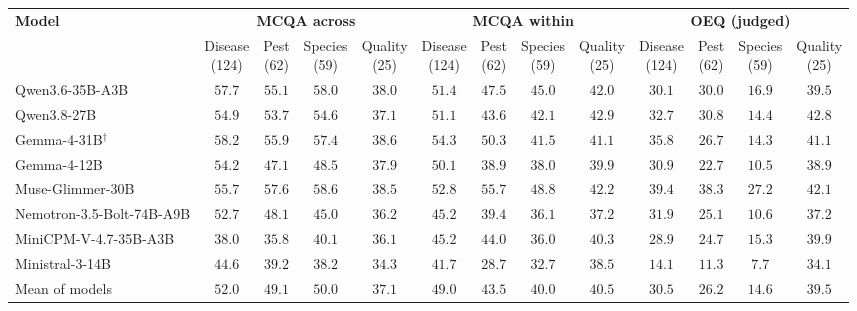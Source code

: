 \setlength{\tabcolsep}{3.5pt}
\begin{tabular}{lcccccccccccc}
\toprule
\multirow{2}{*}{\textbf{Model}} & \multicolumn{4}{c}{\textbf{MCQA across}} & \multicolumn{4}{c}{\textbf{MCQA within}} & \multicolumn{4}{c}{\textbf{OEQ (judged)}} \\
\cmidrule(lr){2-5} \cmidrule(lr){6-9} \cmidrule(lr){10-13}
 & \makecell{Disease\\(124)} & \makecell{Pest\\(62)} & \makecell{Species\\(59)} & \makecell{Quality\\(25)} & \makecell{Disease\\(124)} & \makecell{Pest\\(62)} & \makecell{Species\\(59)} & \makecell{Quality\\(25)} & \makecell{Disease\\(124)} & \makecell{Pest\\(62)} & \makecell{Species\\(59)} & \makecell{Quality\\(25)} \\
\midrule
Qwen3.6-35B-A3B & $57.7$ & $55.1$ & $58.0$ & $38.0$ & $51.4$ & $47.5$ & $45.0$ & $42.0$ & $30.1$ & $30.0$ & $16.9$ & $39.5$ \\
Qwen3.8-27B & $54.9$ & $53.7$ & $54.6$ & $37.1$ & $51.1$ & $43.6$ & $42.1$ & $\mathbf{42.9}$ & $32.7$ & $30.8$ & $14.4$ & $\mathbf{42.8}$ \\
Gemma-4-31B$^\dagger$ & $\mathbf{58.2}$ & $55.9$ & $57.4$ & $\mathbf{38.6}$ & $\mathbf{54.3}$ & $50.3$ & $41.5$ & $41.1$ & $35.8$ & $26.7$ & $14.3$ & $41.1$ \\
Gemma-4-12B & $54.2$ & $47.1$ & $48.5$ & $37.9$ & $50.1$ & $38.9$ & $38.0$ & $39.9$ & $30.9$ & $22.7$ & $10.5$ & $38.9$ \\
Muse-Glimmer-30B & $55.7$ & $\mathbf{57.6}$ & $\mathbf{58.6}$ & $38.5$ & $52.8$ & $\mathbf{55.7}$ & $\mathbf{48.8}$ & $42.2$ & $\mathbf{39.4}$ & $\mathbf{38.3}$ & $\mathbf{27.2}$ & $42.1$ \\
Nemotron-3.5-Bolt-74B-A9B & $52.7$ & $48.1$ & $45.0$ & $36.2$ & $45.2$ & $39.4$ & $36.1$ & $37.2$ & $31.9$ & $25.1$ & $10.6$ & $37.2$ \\
MiniCPM-V-4.7-35B-A3B & $38.0$ & $35.8$ & $40.1$ & $36.1$ & $45.2$ & $44.0$ & $36.0$ & $40.3$ & $28.9$ & $24.7$ & $15.3$ & $39.9$ \\
Ministral-3-14B & $44.6$ & $39.2$ & $38.2$ & $34.3$ & $41.7$ & $28.7$ & $32.7$ & $38.5$ & $14.1$ & $11.3$ & $7.7$ & $34.1$ \\
\midrule
Mean of models & $52.0$ & $49.1$ & $50.0$ & $37.1$ & $49.0$ & $43.5$ & $40.0$ & $40.5$ & $30.5$ & $26.2$ & $14.6$ & $39.5$ \\
\bottomrule
\end{tabular}
